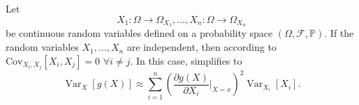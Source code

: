 \begin{remark}
	\label{remark:error_prop_independent}
	Let
	\begin{equation}
		X_1\colon\Omega \to \Omega_{X_1}, \dots, X_n\colon\Omega \to \Omega_{X_n}
	\end{equation}
	be continuous random variables defined on a probability space $(\Omega, \mathcal{F}, \mathbb{P})$.	If the random variables $X_1, \dots, X_n$ are independent, then according to  $\mathrm{Cov}_{X_i,X_j}[X_i, X_j] = 0$ $\forall i \neq j$. In this case,  simplifies to
	\begin{equation}
		\operatorname{Var}_{X}[g(X)] \approx \sum_{i=1}^n \left(\frac{\partial g(X)}{\partial X_i}\Big|_{X = x}\right)^2 \operatorname{Var}_{X_i}[X_i].
		\label{eq:error_prop}
	\end{equation}
\end{remark}

